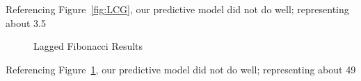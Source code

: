 \documentclass[conference]{IEEEtran}
\begin{document}
Referencing Figure~\ref{fig:LCG}, our predictive model did not do well; representing about 3.5%

\begin{figure}[H]
\centering
{}
\qquad
{}
\caption{Lagged Fibonacci Results}
\label{fig:LF}
\end{figure}

Referencing Figure~\ref{fig:LF}, our predictive model did not do well; representing about 49%
\end{document}
